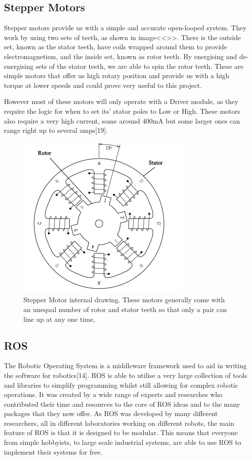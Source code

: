 \documentclass{l4proj}
\begin{document}
\subsection{Stepper Motors}
Stepper motors provide us with a simple and accurate open-looped system. They work by using two sets of teeth, as shown in image<<>>. There is the outside set, known as the stator teeth, have coils wrapped around them to provide electromagnetism, and the inside set, known as rotor teeth. By energising and de-energising sets of the stator teeth, we are able to spin the rotor teeth. These are simple motors that offer us high rotary position and provide us with a high torque at lower speeds and could prove very useful to this project. 

However most of these motors will only operate with a Driver module, as they require the logic for when to set its' stator poles to Low or High. These motors also require a very high current, some around 400mA but some larger ones can range right up to several amps[19]. 

\begin{figure}[!ht]
  \centering
  \includegraphics[width=0.4\linewidth]{images/stepMotor.png}   
  \caption{Stepper Motor internal drawing. These motors generally come with an unequal number of rotor and stator teeth so that only a pair can line up at any one time,}
\end{figure}

\subsection{ROS}
The Robotic Operating System is a middleware framework used to aid in writing the software for robotics[14]. ROS is able to utilise a very large collection of tools and libraries to simplify programming whilst still allowing for complex robotic operations. It was created by a wide range of experts and researches who contributed their time and resources to the core of ROS ideas and to the many packages that they now offer. As ROS was developed by many different researchers, all in different laboratories working on different robots, the main feature of ROS is that it is designed to be modular. This means that everyone from simple hobbyists, to large scale industrial systems, are able to use ROS to implement their systems for free. 
\end{document}
